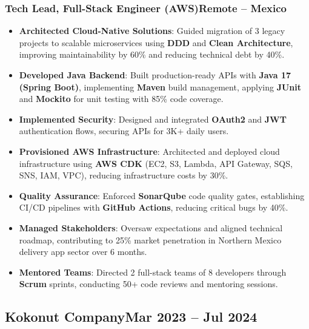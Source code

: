 \documentclass[a4paper,10pt]{article}
\newcommand{\kw}[1]{\textbf{\textcolor{keyword}{#1}}}
\newcommand{\tech}[1]{\textbf{\textcolor{tech}{#1}}}
\begin{document}
\subsubsection*{\small Tech Lead, Full-Stack Engineer (AWS)\hfill Remote -- Mexico}
\begin{itemize}[noitemsep, leftmargin=*]
    \item \textbf{Architected Cloud-Native Solutions}: Guided migration of 3 legacy projects to scalable microservices using \kw{DDD} and \kw{Clean Architecture}, improving maintainability by 60\% and reducing technical debt by 40\%.
    \item \textbf{Developed Java Backend}: Built production-ready APIs with \tech{Java 17 (Spring Boot)}, implementing \tech{Maven} build management, applying \tech{JUnit} and \tech{Mockito} for unit testing with 85\% code coverage.
    \item \textbf{Implemented Security}: Designed and integrated \kw{OAuth2} and \kw{JWT} authentication flows, securing APIs for 3K+ daily users.
    \item \textbf{Provisioned AWS Infrastructure}: Architected and deployed cloud infrastructure using \tech{AWS CDK} (EC2, S3, Lambda, API Gateway, SQS, SNS, IAM, VPC), reducing infrastructure costs by 30\%.
    \item \textbf{Quality Assurance}: Enforced \tech{SonarQube} code quality gates, establishing CI/CD pipelines with \tech{GitHub Actions}, reducing critical bugs by 40\%.
    \item \textbf{Managed Stakeholders}: Oversaw expectations and aligned technical roadmap, contributing to 25\% market penetration in Northern Mexico delivery app sector over 6 months.
    \item \textbf{Mentored Teams}: Directed 2 full-stack teams of 8 developers through \kw{Scrum} sprints, conducting 50+ code reviews and mentoring sessions.
\end{itemize}

\subsection*{\small Kokonut Company\hfill\textbf{Mar 2023 -- Jul 2024}}
\end{document}
